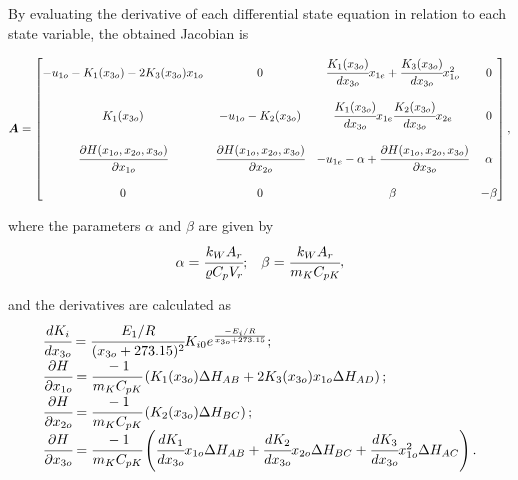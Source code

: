 \documentclass[a4paper,11pt]{book}
\numberwithin{figure}{chapter}
\numberwithin{equation}{chapter}
\numberwithin{table}{chapter}
\theoremstyle{definition}
\begin{document}
By evaluating the derivative of each differential state equation in relation to each state variable, the obtained Jacobian is

\begin{equation} \label{eq:exoLinSS01}
	\bm{A} = \begin{bmatrix}
		-u_{1o} - K_1(x_{3o}) - 2K_3(x_{3o}) x_{1o} & 0 & \cfrac{K_1(x_{3o})}{d x_{3o}} x_{1e} + \cfrac{K_3(x_{3o})}{d x_{3o}} x_{1o}^2 & 0 \\ \\
		K_1(x_{3o}) 					 & -u_{1o} - K_2(x_{3o}) & \cfrac{K_1(x_{3o})}{d x_{3o}} x_{1e} \cfrac{K_2(x_{3o})}{d x_{3o}} x_{2e} & 0 \\ \\
		\cfrac{\partial H(x_{1o},x_{2o},x_{3o})}{\partial x_{1o}} & \cfrac{\partial H(x_{1o},x_{2o},x_{3o})}{\partial x_{2o}} & -u_{1e} - \alpha + \cfrac{\partial H(x_{1o},x_{2o},x_{3o})}{\partial x_{3o}} & \alpha \\ \\
		0 & 0 & \beta & -\beta \\
	\end{bmatrix}
,\end{equation} 

\noindent where the parameters $\alpha$ and $\beta$ are given by
\begin{equation}
\begin{matrix}
	\alpha = \cfrac{k_W A_r}{\varrho C_p V_r}; & \beta = \cfrac{k_W A_r}{m_K C_{pK}}
\end{matrix}
,\end{equation}

\noindent and the derivatives are calculated as
\begin{equation}
\begin{matrix*}[l]
	\cfrac{d K_i}{d x_{3o}} = \cfrac{E_1/R}{(x_{3o} + 273.15)^2} K_{i0} e^{\frac{-E_i / R}{x_{3o} + 273.15}}; \\ 
	\cfrac{\partial H}{\partial x_{1o}} = \cfrac{-1}{m_K C_{pK}} \left( K_1(x_{3o}) \Delta H_{AB} + 2 K_3(x_{3o}) x_{1o} \Delta H_{AD} \right); \\ \cfrac{\partial H}{\partial x_{2o}} = \cfrac{-1}{m_K C_{pK}} \left( K_2(x_{3o}) \Delta H_{BC} \right); \\
	\cfrac{\partial H}{\partial x_{3o}} = \cfrac{-1}{m_K C_{pK}} \left( \cfrac{d K_1}{d x_{3o}} x_{1o} \Delta H_{AB} + \cfrac{d K_2}{d x_{3o}} x_{2o} \Delta H_{BC} + \cfrac{d K_3}{d x_{3o}} x^2_{1o} \Delta H_{AC} \right).
\end{matrix*}
\end{equation}
\end{document}
